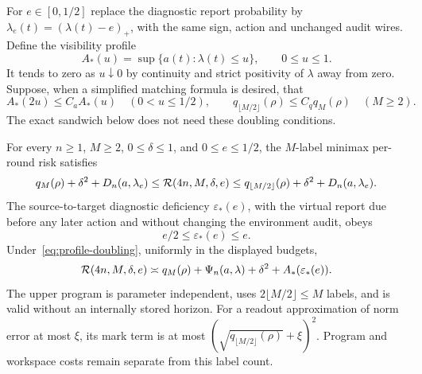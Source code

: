 For $e\in[0,1/2]$ replace the diagnostic report probability by
$\lambda_e(t)=(\lambda(t)-e)_+$, with the same sign, action and unchanged audit wires. Define the visibility profile
\[
 A_*(u)=\sup\{a(t):\lambda(t)\le u\},\qquad 0\le u\le1.
\]
It tends to zero as $u\downarrow0$ by continuity and strict positivity of $\lambda$ away from zero. Suppose, when a simplified matching formula is desired, that
\begin{equation}\label{eq:profile-doubling}
 A_*(2u)\le C_a A_*(u)\quad(0<u\le1/2),\qquad
 q_{\lfloor M/2\rfloor}(\rho)\le C_q q_M(\rho)\quad(M\ge2).
\end{equation}
The exact sandwich below does not need these doubling conditions.

\begin{theorem}\label{thm:profile-joint}
For every $n\ge1$, $M\ge2$, $0\le\delta\le1$, and $0\le e\le1/2$, the $M$-label minimax per-round risk satisfies
\begin{equation}\label{eq:profile-sandwich}
 q_M(\rho)+\delta^2+D_n(a,\lambda_e)
 \le\mathcal R(4n,M,\delta,e)
 \le q_{\lfloor M/2\rfloor}(\rho)+\delta^2+D_n(a,\lambda_e).
\end{equation}
The source-to-target diagnostic deficiency $\varepsilon_*(e)$, with the virtual report due before any later action and without changing the environment audit, obeys
\begin{equation}\label{eq:profile-deficiency}
 e/2\le\varepsilon_*(e)\le e.
\end{equation}
Under~\eqref{eq:profile-doubling}, uniformly in the displayed budgets,
\begin{equation}\label{eq:profile-joint}
 \mathcal R(4n,M,\delta,e)
 \asymp q_M(\rho)+\Psi_n(a,\lambda)+\delta^2+A_*(\varepsilon_*(e)).
\end{equation}
The upper program is parameter independent, uses $2\lfloor M/2\rfloor\le M$ labels, and is valid without an internally stored horizon. For a readout approximation of norm error at most $\xi$, its mark term is at most $(\sqrt{q_{\lfloor M/2\rfloor}(\rho)}+\xi)^2$. Program and workspace costs remain separate from this label count.
\end{theorem}
